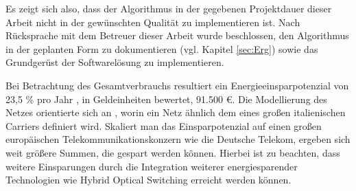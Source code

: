 Es zeigt sich also, dass der Algorithmus in der gegebenen Projektdauer dieser Arbeit nicht in der gewünschten Qualität zu implementieren ist. Nach Rücksprache mit dem Betreuer dieser Arbeit wurde beschlossen, den Algorithmus in der geplanten Form zu dokumentieren (vgl. Kapitel \ref{sec:Erg}) sowie das Grundgerüst der Softwarelösung zu implementieren. 

Bei Betrachtung des Gesamtverbrauchs resultiert ein Energieeinsparpotenzial von 23,5 \% pro Jahr  \cite[5]{Chiaraviglio2009}, in Geldeinheiten\cite{Proteus2016} bewertet, 91.500 €. Die Modellierung des Netzes orientierte sich an \cite{Chiaraviglio2009}, worin ein Netz ähnlich dem eines großen italienischen Carriers definiert wird. Skaliert man das Einsparpotenzial auf einen großen europäischen Telekommunikationskonzern wie die Deutsche Telekom, ergeben sich weit größere Summen, die gespart werden können. Hierbei ist zu beachten, dass weitere Einsparungen durch die Integration weiterer energiesparender Technologien wie Hybrid Optical Switching erreicht werden können.
